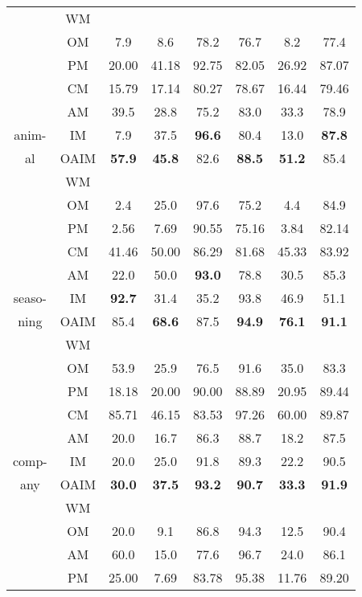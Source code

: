 {{{\begin{tabular}{|c|c|c|c|c|c|c|c|}
       &WM \\\cline{2-8}
       &OM  &7.9   &8.6   &78.2  &76.7  &8.2   &77.4\\\cline{2-8}
       &PM &20.00	&41.18	&92.75	&82.05	&26.92	&87.07\\\cline{2-8}
        &CM &15.79	&17.14	&80.27	&78.67	&16.44	&79.46\\\cline{2-8}
       &AM  &39.5   &28.8   &75.2   &83.0   &33.3   &78.9\\\cline{2-8}
anim-   &IM &7.9    &37.5   &\textbf{96.6}  &80.4   &13.0   &\textbf{87.8}\\\cline{2-8}
    al   &OAIM  &\textbf{57.9}  &\textbf{45.8}  &82.6   &\textbf{88.5}  &\textbf{51.2}  &85.4\\\hline
    &WM \\\cline{2-8}
       &OM  &2.4   &25.0  &97.6  &75.2  &4.4   &84.9\\\cline{2-8}
       &PM &2.56	&7.69	&90.55	&75.16	&3.84	&82.14\\\cline{2-8}
        &CM &41.46	&50.00	&86.29	&81.68	&45.33	&83.92\\\cline{2-8}
       &AM  &22.0   &50.0   &\textbf{93.0}  &78.8   &30.5   &85.3\\\cline{2-8}
seaso-&IM&\textbf{92.7} &31.4   &35.2   &93.8   &46.9   &51.1\\\cline{2-8}
ning    &OAIM   &85.4   &\textbf{68.6}  &87.5   &\textbf{94.9}  &\textbf{76.1}  &\textbf{91.1}\\\hline
&WM \\\cline{2-8}
       &OM  &53.9  &25.9  &76.5  &91.6  &35.0  &83.3\\\cline{2-8}
       &PM &18.18	&20.00	&90.00	&88.89	&20.95	&89.44\\\cline{2-8}
        &CM &85.71	&46.15	&83.53	&97.26	&60.00	&89.87\\\cline{2-8}
     &AM    &20.0   &16.7   &86.3   &88.7   &18.2   &87.5\\\cline{2-8}
comp-   &IM &20.0   &25.0   &91.8   &89.3   &22.2   &90.5\\\cline{2-8}
any  &OAIM  &\textbf{30.0}  &\textbf{37.5}  &\textbf{93.2}  &\textbf{90.7}  &\textbf{33.3}  &\textbf{91.9}\\\hline
&WM \\\cline{2-8}
      &OM   &20.0  &9.1   &86.8  &94.3  &12.5  &90.4\\\cline{2-8}
     &AM    &60.0   &15.0   &77.6   &96.7   &24.0   &86.1\\\cline{2-8}
       &PM &25.00	&7.69	&83.78	&95.38	&11.76	&89.20\\\cline{2-8}

\end{tabular}}}}
